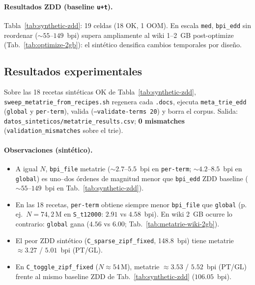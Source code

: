 \paragraph{Resultados ZDD (baseline \texttt{u+t}).}
Tabla~\ref{tab:synthetic-zdd}: 19 celdas (18 OK, 1 OOM).
En escala \texttt{med}, \texttt{bpi\_edd} sin reordenar ($\sim 55$--$149$~bpi)
supera ampliamente al wiki 1--2~GB post-optimize (Tab.~\ref{tab:optimize-2gb}):
el sintético densifica cambios temporales por diseño.


\subsection{Resultados experimentales}
\label{subsec:metatrie-results}

Sobre las 18 recetas sintéticas OK de Tabla~\ref{tab:synthetic-zdd},
\texttt{sweep\_metatrie\_from\_recipes.sh} regenera cada \texttt{.docs}, ejecuta
\texttt{meta\_trie\_edd} (\texttt{global} y \texttt{per-term}), valida
(\texttt{--validate-terms 20}) y borra el corpus.
Salida: \texttt{datos\_sinteticos/metatrie\_results.csv}; \textbf{0 mismatches}
(\texttt{validation\_mismatches} sobre el trie).

\paragraph{Observaciones (sintético).}
\begin{itemize}
\item A igual $N$, \texttt{bpi\_file} metatrie ($\sim 2.7$--$5.5$~bpi en \texttt{per-term};
      $\sim 4.2$--$8.5$~bpi en \texttt{global})
      es uno--dos órdenes de magnitud menor que \texttt{bpi\_edd} ZDD baseline
      ($\sim 55$--$149$~bpi en Tab.~\ref{tab:synthetic-zdd}).
\item En las 18 recetas, \texttt{per-term} obtiene siempre menor \texttt{bpi\_file} que
      \texttt{global} (p.\,ej.\ $N=74{,}2$\,M en \texttt{S\_t12000}: $2.91$ vs $4.58$~bpi).
      En wiki 2~GB ocurre lo contrario: \texttt{global} gana ($4.56$ vs $6.00$; Tab.~\ref{tab:metatrie-wiki-2gb}).
\item El peor ZDD sintético (\texttt{C\_sparse\_zipf\_fixed}, 148.8~bpi) tiene metatrie
      $\approx 3.27$ / $5.01$~bpi (PT/GL).
\item En \texttt{C\_toggle\_zipf\_fixed} ($N\approx 54$\,M), metatrie $\approx 3.53$ /
      $5.52$~bpi (PT/GL) frente al mismo baseline ZDD de Tab.~\ref{tab:synthetic-zdd}
      ($106.05$~bpi).
\end{itemize}

